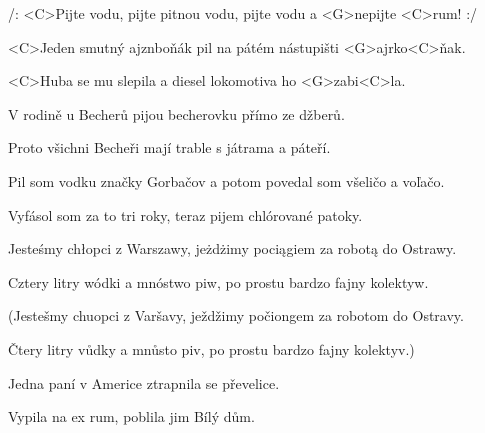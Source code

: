 
\zr
/: <C>Pijte vodu, pijte pitnou vodu, pijte vodu a <G>nepijte <C>rum! :/
\kr

\zs
<C>Jeden smutný ajznboňák pil na pátém nástupišti 
<G>ajrko<C>ňak.

<C>Huba se mu slepila a diesel lokomotiva ho <G>zabi<C>la.
\ks

\zr \kr

\zs
V rodině u Becherů pijou becherovku přímo ze džberů.

Proto všichni Becheři mají trable s játrama a páteří.
\ks

\zr \kr

\zs
Pil som vodku značky Gorbačov a potom povedal som všeličo a voľačo.

Vyfásol som za to tri roky, teraz pijem chlórované patoky.
\ks

\zr \kr

\zs
Jesteśmy chłopci z Warszawy, jeżdżimy pociągiem za robotą do Ostrawy.

Cztery litry wódki a mnóstwo piw, po prostu bardzo fajny kolektyw.

(Jestešmy chuopci z Varšavy, ježdžimy počiongem za robotom do Ostravy.

Čtery litry vůdky a mnůsto piv, po prostu bardzo fajny kolektyv.)

\ks

\zr \kr

\zs
Jedna paní v Americe ztrapnila se převelice.

Vypila na ex rum, poblila jim Bílý dům.
\ks

\zr \kr

\kp
